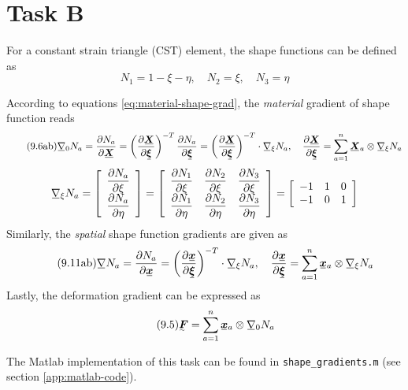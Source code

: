 \section{Task B}
\label{sec:task-b}

For a constant strain triangle (CST) element, the shape functions can be defined as
\begin{equation}
  \label{eq:shape-func}
  N_{1} = 1 - \xi - \eta, \quad N_{2} = \xi, \quad N_{3} = \eta
\end{equation}

According to equations \eqref{eq:material-shape-grad}, the \textit{material}
gradient of shape function reads
\begin{equation} \tag{9.6ab} \label{eq:material-shape-grad}
  \ubar{\nabla}_{0}N_{a} = \frac{\partial N_{a}}{\partial \ubar{\bm{X}}} = 
  \left( \frac{\partial \ubar{\bm{X}}}{\partial \ubar{\bm{\xi}}} \right)^{-T}
  \frac{\partial N_{a}}{\partial \ubar{\bm{\xi}}} =
  \left( \frac{\partial \ubar{\bm{X}}}{\partial \ubar{\bm{\xi}}} \right)^{-T}
  \cdot \ubar{\nabla}_{\xi} N_{a}, \quad
  \frac{\partial \ubar{\bm{X}}}{\partial \ubar{\bm{\xi}}} 
  = \sum_{a=1}^{n} \ubar{\bm{X}}_{a} \otimes \ubar{\nabla}_{\xi}N_{a}
\end{equation}
%
\begin{equation}
  \ubar{\nabla}_{\xi} N_{a} = \left[
    \begin{array}{c}
      \dfrac{\partial N_{a}}{\partial \xi} \\
      \dfrac{\partial N_{a}}{\partial \eta} \\
	\end{array} \right] =
  \left[
    \begin{array}{c c c}
      \dfrac{\partial N_{1}}{\partial \xi} & \dfrac{\partial N_{2}}{\partial \xi} & \dfrac{\partial N_{3}}{\partial \xi}\\
      \dfrac{\partial N_{1}}{\partial \eta} & \dfrac{\partial N_{2}}{\partial \eta} & \dfrac{\partial N_{3}}{\partial \eta}\\
	\end{array} \right]  =
  \left[
    \begin{array}{c c c}
      -1 & 1 & 0 \\
      -1 & 0 & 1 \\
	\end{array} \right]
\end{equation}
Similarly, the \textit{spatial} shape function gradients are given as
\begin{equation} \tag{9.11ab}
  \label{eq:spatial-shape-grad}
  \ubar{\nabla} N_{a} = \frac{\partial N_{a}}{\partial \ubar{\bm{x}}} =
  \left( \frac{\partial \ubar{\bm{x}}}{\partial \ubar{\bm{\xi}}} \right)^{-T}
  \cdot \ubar{\nabla}_{\xi} N_{a}, \quad
  \frac{\partial \ubar{\bm{x}}}{\partial \ubar{\bm{\xi}}} 
  = \sum_{a=1}^{n} \ubar{\bm{x}}_{a} \otimes \ubar{\nabla}_{\xi}N_{a}
\end{equation}
Lastly, the deformation gradient can be expressed as
\begin{equation} \tag{9.5}
  \label{eq:deform-grad}
  \utilde{F} = \sum_{a=1}^{n} \ubar{\bm{x}}_{a} \otimes \ubar{\nabla}_{0} N_{a}
\end{equation}

The Matlab implementation of this task can be found in \texttt{shape\_gradients.m}
(see section \ref{app:matlab-code}).

